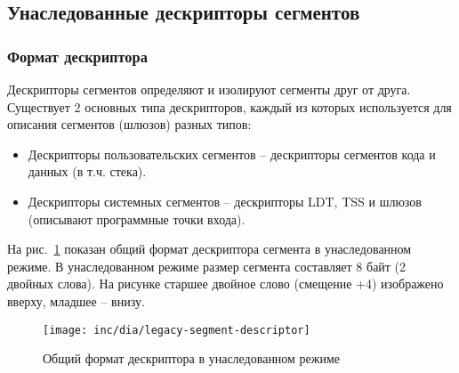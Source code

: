 \subsection{Унаследованные дескрипторы сегментов}
\subsubsection*{Формат дескриптора}
Дескрипторы сегментов определяют и изолируют сегменты друг от друга. Существует 2 основных типа
дескрипторов, каждый из которых используется для описания сегментов (шлюзов) разных типов:
\begin{itemize}
	\item Дескрипторы пользовательских сегментов -- дескрипторы сегментов кода и данных (в т.ч. стека).
	\item Дескрипторы системных сегментов -- дескрипторы LDT, TSS и шлюзов (описывают программные точки входа).
\end{itemize}

На рис.~\ref{fig:legacy-segment-descriptor-format} показан общий формат дескриптора сегмента в унаследованном режиме.
В унаследованном режиме размер сегмента составляет 8 байт (2 двойных слова). На рисунке старшее двойное слово (смещение +4)
изображено вверху, младшее -- внизу.

\begin{figure}[ht!]
  \centering
  \texttt{[image: inc/dia/legacy-segment-descriptor]}
  \caption{Общий формат дескриптора в унаследованном режиме}
  \label{fig:legacy-segment-descriptor-format}
\end{figure}

